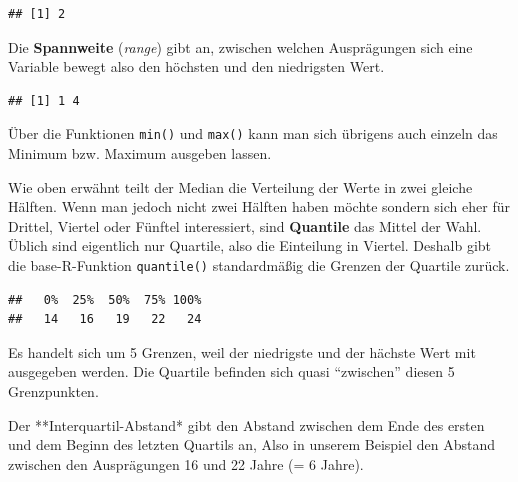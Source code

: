 \documentclass[
]{book}
\newenvironment{Shaded}{\begin{snugshade}}{\end{snugshade}}
\newcommand{\AttributeTok}[1]{\textcolor[rgb]{0.77,0.63,0.00}{#1}}
\newcommand{\ConstantTok}[1]{\textcolor[rgb]{0.00,0.00,0.00}{#1}}
\newcommand{\FunctionTok}[1]{\textcolor[rgb]{0.00,0.00,0.00}{#1}}
\newcommand{\NormalTok}[1]{#1}
\newcommand{\SpecialCharTok}[1]{\textcolor[rgb]{0.00,0.00,0.00}{#1}}
\begin{document}
\begin{verbatim}
## [1] 2
\end{verbatim}

Die \textbf{Spannweite} (\emph{range}) gibt an, zwischen welchen Ausprägungen sich eine Variable bewegt also den höchsten und den niedrigsten Wert.

\begin{Shaded}
\end{Shaded}

\begin{verbatim}
## [1] 1 4
\end{verbatim}

Über die Funktionen \texttt{min()} und \texttt{max()} kann man sich übrigens auch einzeln das Minimum bzw. Maximum ausgeben lassen.

Wie oben erwähnt teilt der Median die Verteilung der Werte in zwei gleiche Hälften. Wenn man jedoch nicht zwei Hälften haben möchte sondern sich eher für Drittel, Viertel oder Fünftel interessiert, sind \textbf{Quantile} das Mittel der Wahl. Üblich sind eigentlich nur Quartile, also die Einteilung in Viertel. Deshalb gibt die base-R-Funktion \texttt{quantile()} standardmäßig die Grenzen der Quartile zurück.

\begin{Shaded}
\end{Shaded}

\begin{verbatim}
##   0%  25%  50%  75% 100% 
##   14   16   19   22   24
\end{verbatim}

Es handelt sich um 5 Grenzen, weil der niedrigste und der hächste Wert mit ausgegeben werden. Die Quartile befinden sich quasi ``zwischen'' diesen 5 Grenzpunkten.

Der **Interquartil-Abstand* gibt den Abstand zwischen dem Ende des ersten und dem Beginn des letzten Quartils an, Also in unserem Beispiel den Abstand zwischen den Ausprägungen 16 und 22 Jahre (= 6 Jahre).
\end{document}
